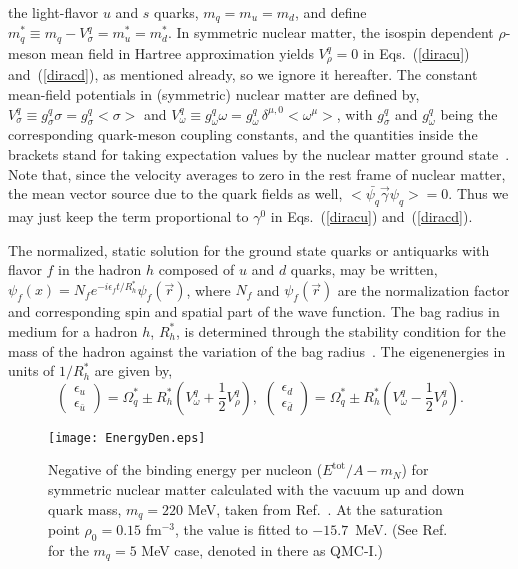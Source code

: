 \documentclass[preprint,aps,showpacs,floatfix]{revtex4}
\newcommand{\bge}{\begin{equation}}
\newcommand{\ene}{\end{equation}}
\def\Qbar{\overline{Q}}
\begin{document}
the light-flavor $u$ and $s$ quarks,
$m_q = m_u = m_d$, and define $m^*_q \equiv m_q - V^q_\sigma = m^*_u = m^*_d$.
In symmetric nuclear matter, the isospin dependent $\rho$-meson mean field
in Hartree approximation yields $V^q_\rho = 0$ in Eqs.~(\ref{diracu})
and~(\ref{diracd}), as mentioned already, so we ignore it hereafter.
The constant mean-field potentials in (symmetric) nuclear matter are defined by,
$V^q_\sigma \equiv g^q_\sigma \sigma = g^q_\sigma <\sigma>$ and
$V^q_\omega \equiv g^q_\omega \omega = g^q_\omega\, \delta^{\mu,0} <\omega^\mu>$,
with $g^q_\sigma$ and $g^q_\omega$ being the corresponding quark-meson coupling constants,
and the quantities inside the brackets stand for taking expectation values
by the nuclear matter ground state~\cite{QMCreview}.
Note that, since the velocity averages to zero in the rest frame of nuclear matter,
the mean vector source due to the quark fields as well,
$<\bar{\psi_q} \vec{\gamma} \psi_q> = 0$.
Thus we may just keep the term proportional to $\gamma^0$ in Eqs.~(\ref{diracu})
and~(\ref{diracd}).

The normalized, static solution for the ground state quarks or antiquarks
with flavor $f$ in the hadron $h$ composed of $u$ and $d$ quarks, may be written,
$\psi_f (x) = N_f e^{- i \epsilon_f t / R_h^*}
\psi_f (\vec{r})$,
where $N_f$ and $\psi_f(\vec{r})$
are the normalization factor and
corresponding spin and spatial part of the wave function.
The bag radius in medium for a hadron $h$, $R_h^*$,
is determined through the
stability condition for the mass of the hadron against the
variation of the bag radius~\cite{QMCreview}.
The eigenenergies in units of $1/R_h^*$ are given by,
\bge
\left( \begin{array}{c}
\epsilon_u \\
\epsilon_{\bar{u}}
\end{array} \right)
= \Omega_q^* \pm R_h^* \left(
V^q_\omega
+ \frac{1}{2} V^q_\rho \right),\,\,
%
\left( \begin{array}{c} \epsilon_d \\
\epsilon_{\bar{d}}
\end{array} \right)
= \Omega_q^* \pm R_h^* \left(
V^q_\omega
- \frac{1}{2} V^q_\rho \right).
%
\label{energy}
\ene

\begin{figure}[tb]
\begin{center}
\texttt{[image: EnergyDen.eps]}
\caption{Negative of the binding energy per nucleon ($E^\mathrm{tot}/A - m_N$) for symmetric
nuclear matter calculated with the vacuum up and down quark mass, $m_q = 220$ MeV, 
taken from Ref.~\cite{pimedium1,pimedium2,pimedium3,pimedium4}.
At the saturation point $\rho_0 = 0.15$ fm$^{-3}$, the value is fitted to $-15.7$~MeV.
(See Ref.~\cite{QMCreview} for the $m_q = 5$ MeV case, denoted in there as QMC-I.)
\label{Fig:Eden}
}
\end{center}
\end{figure}
\end{document}
